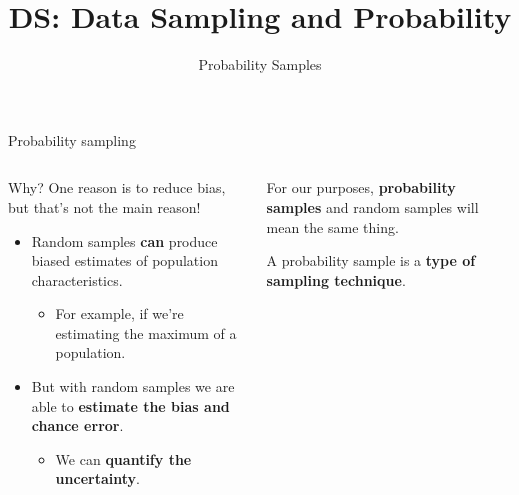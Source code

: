 \documentclass[aspectratio=169]{../latex_main/tntbeamer}  %
\title[Introduction]{DS: Data Sampling and Probability}
\subtitle{Probability Samples}
\begin{document}
	
	\maketitle
		\begin{frame}{Probability sampling}
	    \begin{columns}
	        \begin{column}{.4\textwidth}
	            Why? One reason is to reduce bias, but that’s not the main reason!
	            \begin{itemize}
	                \item Random samples \textbf{can} produce biased estimates of population characteristics.
	                \begin{itemize}
	                    \item For example, if we’re estimating the maximum of a population.
	                \end{itemize}
	                \item But with random samples we are able to \textbf{estimate the bias and chance error}.
	                \begin{itemize}
	                    \item We can \textbf{quantify the uncertainty}.
	                \end{itemize}
	            \end{itemize}
	        \end{column}
	        
	        \begin{column}{.5\textwidth}
	            For our purposes, \textbf{probability samples} and random samples will mean the same thing.
             
	            \bigskip
	            A probability sample is a \textbf{type of sampling technique}.
	        \end{column}
	        
	    \end{columns}
	    
	\end{frame}
	
\end{document}
